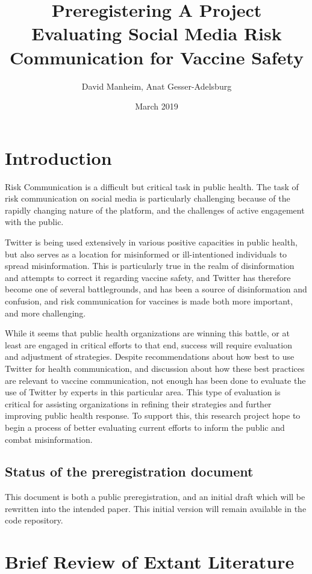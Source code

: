 \documentclass{article}
\title{Preregistering A Project Evaluating Social Media Risk Communication for Vaccine Safety}
\author{David Manheim, Anat Gesser-Adelsburg}
\date{March 2019}
\begin{document}
\maketitle

\section{Introduction}
Risk Communication is a difficult but critical task in public health. The task of risk communication on social media is particularly challenging because of the rapidly changing nature of the platform, and the challenges of active engagement with the public. 

Twitter is being used extensively in various positive capacities in public health\cite{a,b,c,d}, but also serves as a location for misinformed or ill-intentioned individuals to spread misinformation\cite{e,f,g,h}. This is particularly true in the realm of disinformation and attempts to correct it regarding vaccine safety, and Twitter has therefore become one of several battlegrounds, and has been a source of disinformation and confusion\cite{i,j,k}, and risk communication for vaccines is made both more important, and more challenging.

While it seems that public health organizations are winning this battle, or at least are engaged in critical efforts to that end, success will require evaluation and adjustment of strategies. Despite recommendations about how best to use Twitter for health communication, and discussion about how these best practices are relevant to vaccine communication, not enough has been done to evaluate the use of Twitter by experts in this particular area. This type of evaluation is critical for assisting organizations in refining their strategies and further improving public health response. To support this, this research project hope to begin a process of better evaluating current efforts to inform the public and combat misinformation.

\subsection{Status of the preregistration document}
This document is both a public preregistration, and an initial draft which will be rewritten into the intended paper. This initial version will remain available in the code repository.

\section{Brief Review of Extant Literature}
\end{document}
